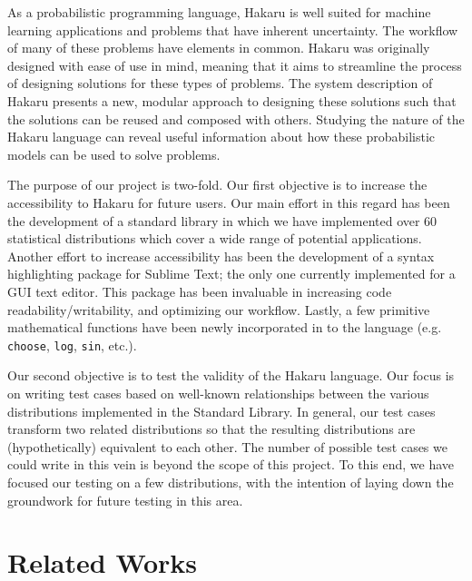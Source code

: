 \documentclass[11pt]{article}
\begin{document}
\begin{justify}

As a probabilistic programming language, Hakaru is well suited for machine learning applications and problems that have inherent uncertainty. The workflow of many of these problems have elements in common. Hakaru was originally designed with ease of use in mind, meaning that it aims to streamline the process of designing solutions for these types of problems. The system description of Hakaru presents a new, modular approach to designing these solutions such that the solutions can be reused and composed with others. Studying the nature of the Hakaru language can reveal useful information about how these probabilistic models can be used to solve problems. 

The purpose of our project is two-fold. Our first objective is to increase the accessibility to Hakaru for future users. Our main effort in this regard has been the development of a standard library in which we have implemented over 60 statistical distributions which cover a wide range of potential applications. Another effort to increase accessibility has been the development of a syntax highlighting package for Sublime Text; the only one currently implemented for a GUI text editor. This package has been invaluable in increasing code readability/writability, and optimizing our workflow. Lastly, a few primitive mathematical functions have been newly incorporated in to the language (e.g. {\tt choose}, {\tt log}, {\tt sin}, etc.). 

Our second objective is to test the validity of the Hakaru language. Our focus is on writing test cases based on well-known relationships between the various distributions implemented in the Standard Library. In general, our test cases transform two related distributions so that the resulting distributions are (hypothetically) equivalent to each other. The number of possible test cases we could write in this vein is beyond the scope of this project. To this end, we have focused our testing on a few distributions, with the intention of laying down the groundwork for future testing in this area.

\end{justify}


\section{Related Works}
\end{document}
